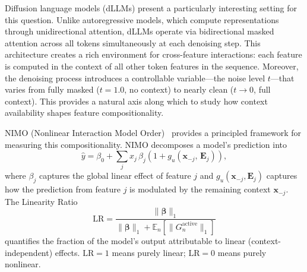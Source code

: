 \documentclass[11pt]{article}
\newcommand{\LR}{\mathrm{LR}}
\newcommand{\bfx}{\mathbf{x}}
\newcommand{\bfbeta}{\boldsymbol{\beta}}
\begin{document}
Diffusion language models (dLLMs) present a particularly interesting setting for this question.
Unlike autoregressive models, which compute representations through unidirectional attention, dLLMs operate via bidirectional masked attention across all tokens simultaneously at each denoising step.
This architecture creates a rich environment for cross-feature interactions: each feature is computed in the context of all other token features in the sequence.
Moreover, the denoising process introduces a controllable variable---the noise level $t$---that varies from fully masked ($t = 1.0$, no context) to nearly clean ($t \to 0$, full context).
This provides a natural axis along which to study how context availability shapes feature compositionality.

NIMO (Nonlinear Interaction Model Order)~\citep{xu2026nimo} provides a principled framework for measuring this compositionality.
NIMO decomposes a model's prediction into
\begin{equation}
    \hat{y} = \beta_0 + \sum_j x_j\,\beta_j\!\left(1 + g_u(\bfx_{-j},\,\mathbf{E}_j)\right),
    \label{eq:nimo}
\end{equation}
where $\beta_j$ captures the global linear effect of feature $j$ and $g_u(\bfx_{-j}, \mathbf{E}_j)$ captures how the prediction from feature $j$ is modulated by the remaining context $\bfx_{-j}$.
The Linearity Ratio
\begin{equation}
    \LR = \frac{\|\bfbeta\|_1}{\|\bfbeta\|_1 + \mathbb{E}_n\!\left[\|G_n^{\mathrm{active}}\|_1\right]}
    \label{eq:lr}
\end{equation}
quantifies the fraction of the model's output attributable to linear (context-independent) effects. $\LR = 1$ means purely linear; $\LR = 0$ means purely nonlinear.
\end{document}
